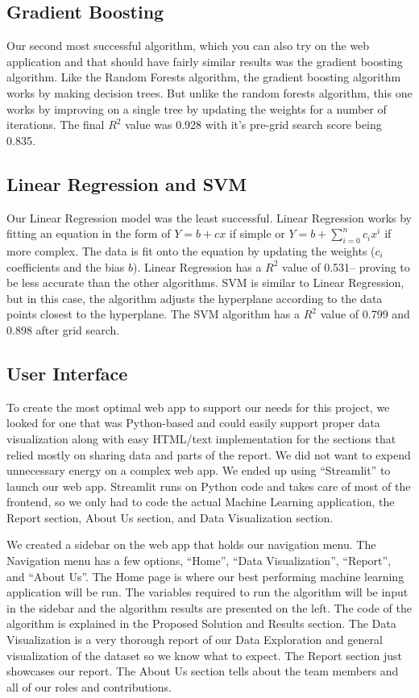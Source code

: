 \documentclass[main.tex]{subfiles}
\begin{document}
\subsection{Gradient Boosting}
Our second most successful algorithm, which you can also try on the web application and that
should have fairly similar results was the gradient boosting algorithm\cite{Singh2018}. Like the Random Forests
algorithm, the gradient boosting algorithm works by making decision trees. But unlike the
random forests algorithm, this one works by improving on a single tree by updating the weights
for a number of iterations. The final $R^2$ value was 0.928 with it’s pre-grid search score being
0.835.

\subsection{Linear Regression and SVM}
Our Linear Regression model\cite{StatisticsSolutions} was the least successful. Linear Regression works by fitting an
equation in the form of $Y = b + cx$ if simple or $Y = b + \sum_{i=0}^{n}c_ix^i$ if more
complex. The data is fit onto the equation by updating the weights ($c_i$ coefficients and the bias $b$). Linear
Regression has a $R^2$ value of 0.531-- proving to be less accurate than the other algorithms.
SVM\cite{Gandhi2018} is similar to Linear Regression, but in this case, the algorithm adjusts the hyperplane
according to the data points closest to the hyperplane. The SVM algorithm has a $R^2$ value of
0.799 and 0.898 after grid search.

\subsection{User Interface}
To create the most optimal web app to support our needs for this project, we looked for
one that was Python-based and could easily support proper data visualization along with easy
HTML/text implementation for the sections that relied mostly on sharing data and parts of the
report. We did not want to expend unnecessary energy on a complex web app. We ended up
using “Streamlit” to launch our web app. Streamlit runs on Python code and takes care of most of
the frontend, so we only had to code the actual Machine Learning application, the Report section,
About Us section, and Data Visualization section.

We created a sidebar on the web app that holds our navigation menu. The Navigation
menu has a few options, “Home”, “Data Visualization”, “Report”, and “About Us”. The Home
page is where our best performing machine learning application will be run. The variables
required to run the algorithm will be input in the sidebar and the algorithm results are presented
on the left. The code of the algorithm is explained in the Proposed Solution and Results section.
The Data Visualization is a very thorough report of our Data Exploration and general
visualization of the dataset so we know what to expect. The Report section just showcases our
report. The About Us section tells about the team members and all of our roles and contributions.
\end{document}
